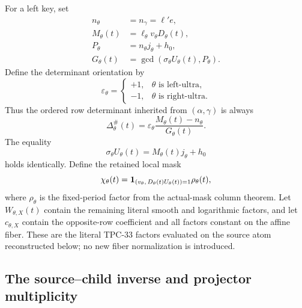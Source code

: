 For a left key, set
\begin{align}
 n_\theta&=n_\gamma=\ell'e,
\label{eq:affine-opposite-row}\\
 M_\theta(t)&=\ell_\theta v_\theta D_\theta(t),
\label{eq:affine-moving-row}\\
 P_\theta&=n_\theta j_\theta+h_0,
\label{eq:affine-opposite-target}\\
 G_\theta(t)&=\gcd(
 \sigma_\theta U_\theta(t),P_\theta).
\label{eq:affine-native-content}
\end{align}
Define the determinant orientation by
\begin{equation}
 \varepsilon_\theta=
 \begin{cases}
 +1,&\theta\text{ is left-ultra},\\
 -1,&\theta\text{ is right-ultra}.
 \end{cases}
\label{eq:affine-orientation}
\end{equation}
Thus the ordered row determinant inherited from
\((\alpha,\gamma)\) is always
\begin{equation}
 \Delta^\#_\theta(t)
 =
 \varepsilon_\theta
 \frac{M_\theta(t)-n_\theta}{G_\theta(t)}.
\label{eq:affine-oriented-determinant}
\end{equation}
The equality
\[
 \sigma_\theta U_\theta(t)
 =
 M_\theta(t)j_\theta+h_0
\]
holds identically.  Define the retained local mask
\begin{equation}
 \chi_\theta(t)
 =
 \mathbf 1_{\left(v_\theta,\,
 D_\theta(t)U_\theta(t)\right)=1}
 \rho_\theta(t),
\label{eq:affine-local-mask}
\end{equation}
where \(\rho_\theta\) is the fixed-period factor from the actual-mask
column theorem.  Let \(W_{\theta,X}(t)\) contain the remaining literal
smooth and logarithmic factors, and let \(c_{\theta,X}\) contain the
opposite-row coefficient and all factors constant on the affine
fiber.  These are the literal TPC-33 factors evaluated on the source
atom reconstructed below; no new fiber normalization is introduced.

\subsection{The source--child inverse and projector multiplicity}

